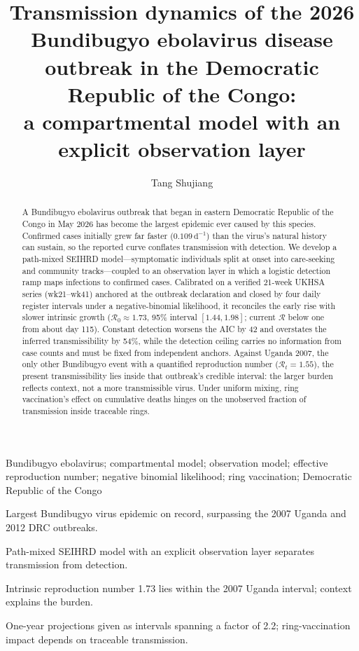 \documentclass[preprint,12pt,numbers]{elsarticle}
\newcommand{\Reff}{\mathcal{R}}
\begin{document}
\begin{frontmatter}
\title{Transmission dynamics of the 2026 Bundibugyo ebolavirus disease
outbreak in the Democratic Republic of the Congo:\\
a compartmental model with an explicit observation layer}

\author{Tang Shujiang}
\address{School of Science, Hunan Institute of Science and Engineering,
Yongzhou, China. Email: sjtang@huse.edu.cn}

\begin{abstract}
A Bundibugyo ebolavirus outbreak that began in eastern Democratic
Republic of the Congo in May 2026 has become the largest epidemic ever
caused by this species. Confirmed cases initially grew far faster
($0.109\,\mathrm{d}^{-1}$) than the virus's natural history can sustain,
so the reported curve conflates transmission with detection. We develop a
path-mixed SEIHRD model---symptomatic individuals split at onset into
care-seeking and community tracks---coupled to an observation layer in
which a logistic detection ramp maps infections to confirmed cases.
Calibrated on a verified 21-week UKHSA series (wk21--wk41) anchored at
the outbreak declaration and closed by four daily register intervals
under a negative-binomial likelihood, it reconciles the early rise with
slower intrinsic growth ($\Reff_0\approx1.73$, 95\% interval
$[1.44,1.98]$; current $\Reff$ below one from about day 115). Constant
detection worsens the AIC by 42 and overstates the inferred
transmissibility by 54\%, while the detection ceiling carries no
information from case counts and must be fixed from independent anchors.
Against Uganda 2007, the only other Bundibugyo event with a quantified
reproduction number ($\Reff_t=1.55$), the present transmissibility lies
inside that outbreak's credible interval: the larger burden reflects
context, not a more transmissible virus. Under uniform mixing, ring
vaccination's effect on cumulative deaths hinges on the unobserved
fraction of transmission inside traceable rings.
\end{abstract}

\begin{keyword}
Bundibugyo ebolavirus; compartmental model; observation model; effective
reproduction number; negative binomial likelihood; ring vaccination;
Democratic Republic of the Congo
\end{keyword}

\begin{highlights}
\item Largest Bundibugyo virus epidemic on record, surpassing the 2007 Uganda and 2012 DRC outbreaks.
\item Path-mixed SEIHRD model with an explicit observation layer separates transmission from detection.
\item Intrinsic reproduction number 1.73 lies within the 2007 Uganda interval; context explains the burden.
\item One-year projections given as intervals spanning a factor of 2.2; ring-vaccination impact depends on traceable transmission.
\end{highlights}


\end{frontmatter}
\end{document}
